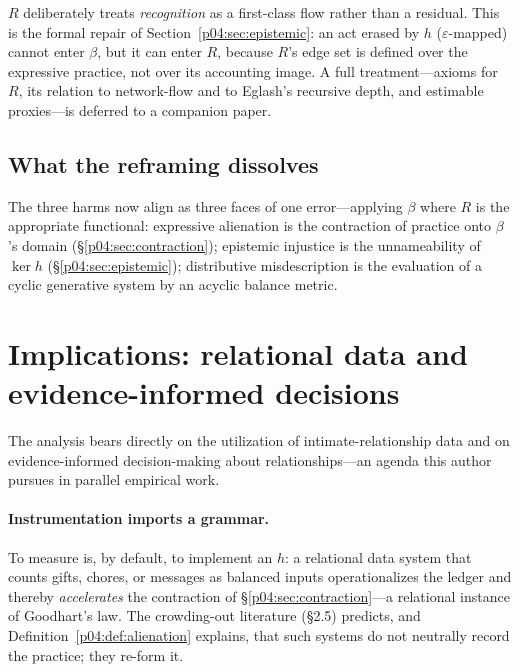 \begin{remark}
$R$ deliberately treats \emph{recognition} as a first-class flow rather than
a residual. This is the formal repair of Section~\ref{p04:sec:epistemic}: an
act erased by $h$ ($\varepsilon$-mapped) cannot enter $\beta$, but it can
enter $R$, because $R$'s edge set is defined over the expressive practice,
not over its accounting image. A full treatment---axioms for $R$,
its relation to network-flow and to Eglash's recursive depth, and estimable
proxies---is deferred to a companion paper.
\end{remark}

\subsection{What the reframing dissolves}
The three harms now align as three faces of one error---applying $\beta$
where $R$ is the appropriate functional:
expressive alienation is the contraction of practice onto $\beta$'s domain
(\S\ref{p04:sec:contraction}); epistemic injustice is the unnameability of
$\ker h$ (\S\ref{p04:sec:epistemic}); distributive misdescription is the
evaluation of a cyclic generative system by an acyclic balance metric.

\section{Implications: relational data and evidence-informed decisions}
\label{p04:sec:data}

The analysis bears directly on the utilization of intimate-relationship data
and on evidence-informed decision-making about relationships---an agenda this
author pursues in parallel empirical work.

\paragraph{Instrumentation imports a grammar.}
To measure is, by default, to implement an $h$: a relational data system that
counts gifts, chores, or messages as balanced inputs operationalizes the
ledger and thereby \emph{accelerates} the contraction of
\S\ref{p04:sec:contraction}---a relational instance of Goodhart's law. The
crowding-out literature (\S2.5) predicts, and Definition~\ref{p04:def:alienation}
explains, that such systems do not neutrally record the practice; they
re-form it.

